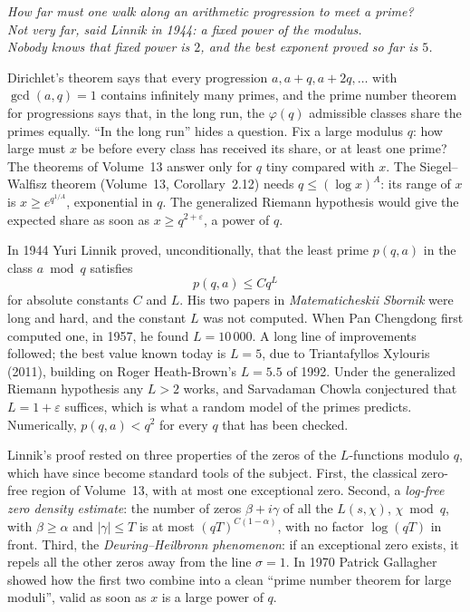 \begin{center}\itshape
How far must one walk along an arithmetic progression to meet a prime?\\
Not very far, said Linnik in 1944: a fixed power of the modulus.\\
Nobody knows that fixed power is $2$, and the best exponent proved so far is $5$.
\end{center}

Dirichlet's theorem says that every progression $a,a+q,a+2q,\dots$ with $\gcd(a,q)=1$ contains infinitely many primes, and the prime number theorem for progressions says that, in the long run, the $\varphi(q)$ admissible classes share the primes equally. ``In the long run'' hides a question. Fix a large modulus $q$: how large must $x$ be before every class has received its share, or at least one prime? The theorems of Volume~13 answer only for $q$ tiny compared with $x$. The Siegel--Walfisz theorem (Volume~13, Corollary~2.12) needs $q\le(\log x)^A$: its range of $x$ is $x\ge e^{q^{1/A}}$, exponential in $q$. The generalized Riemann hypothesis would give the expected share as soon as $x\ge q^{2+\varepsilon}$, a power of $q$.

In 1944 Yuri Linnik proved, unconditionally, that the least prime $p(q,a)$ in the class $a\bmod q$ satisfies
\[
p(q,a)\le Cq^L
\]
for absolute constants $C$ and $L$. His two papers in \emph{Matematicheskii Sbornik} were long and hard, and the constant $L$ was not computed. When Pan Chengdong first computed one, in 1957, he found $L=10\,000$. A long line of improvements followed; the best value known today is $L=5$, due to Triantafyllos Xylouris (2011), building on Roger Heath-Brown's $L=5.5$ of 1992. Under the generalized Riemann hypothesis any $L>2$ works, and Sarvadaman Chowla conjectured that $L=1+\varepsilon$ suffices, which is what a random model of the primes predicts. Numerically, $p(q,a)<q^2$ for every $q$ that has been checked.

Linnik's proof rested on three properties of the zeros of the $L$-functions modulo $q$, which have since become standard tools of the subject. First, the classical zero-free region of Volume~13, with at most one exceptional zero. Second, a \emph{log-free zero density estimate}: the number of zeros $\beta+i\gamma$ of all the $L(s,\chi)$, $\chi\bmod q$, with $\beta\ge\alpha$ and $|\gamma|\le T$ is at most $(qT)^{C(1-\alpha)}$, with no factor $\log(qT)$ in front. Third, the \emph{Deuring--Heilbronn phenomenon}: if an exceptional zero exists, it repels all the other zeros away from the line $\sigma=1$. In 1970 Patrick Gallagher showed how the first two combine into a clean ``prime number theorem for large moduli'', valid as soon as $x$ is a large power of $q$.

